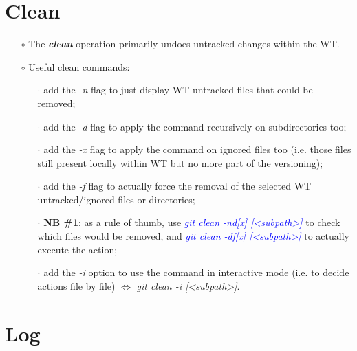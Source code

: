 \documentclass[a4paper,portrait,10pt]{article}   %
\newcommand{\mybulletlvA}{$\circ$}   %
\newcommand{\mybulletlvB}{$\cdot$}   %
\newcommand{\mydiv}{$\Leftrightarrow$ }   %
\newcommand{\mycmd}[1]{\textcolor{blue}{\textit{#1}}}   %
\newcommand{\myparvspace}{\vspace{4mm}}   %
\newcommand{\mysecvspace}{\vspace{6mm}}   %
\begin{document}

\section{Clean}   \label{sec:Clean}

\begin{itemize}
\item[\mybulletlvA] The \textbf{\textit{clean}} operation primarily undoes untracked changes within the WT.
\myparvspace

\item[\mybulletlvA] Useful clean commands:
\begin{itemize}
  \item[\mybulletlvB] add the \textit{-n} flag to just display WT untracked files that could be removed;
  \item[\mybulletlvB] add the \textit{-d} flag to apply the command recursively on subdirectories too;
  \item[\mybulletlvB] add the \textit{-x} flag to apply the command on ignored files too (i.e. those files still present locally within WT but no more part of the versioning);
  \item[\mybulletlvB] add the \textit{-f} flag to actually force the removal of the selected WT untracked/ignored files or directories;
  \item[\mybulletlvB] \textbf{NB \#1}: as a rule of thumb, use \mycmd{git clean -nd[x] [<subpath>]} to check which files would be removed, and \mycmd{git clean -df[x] [<subpath>]} to actually execute the action;
  \item[\mybulletlvB] add the \textit{-i} option to use the command in interactive mode (i.e. to decide actions file by file) \mydiv \textit{git clean -i [<subpath>]}.
\end{itemize}
\end{itemize}
\mysecvspace


\section{Log}   \label{sec:Log}
\end{document}
